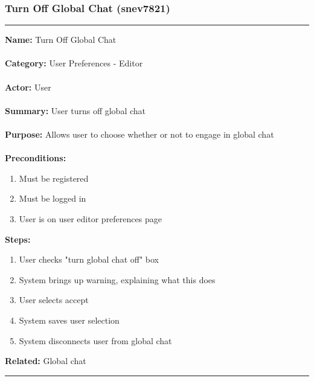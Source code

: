 \documentclass[11pt]{report}
\begin{document}
\subsubsection{Turn Off Global Chat (snev7821)}
\vspace{2pt}
\hrule
\vspace{8pt}
	\noindent\textbf{Name:} Turn Off Global Chat \\ \\
	\textbf{Category:} User Preferences - Editor  \\ \\
	\textbf{Actor:} User \\ \\
	\textbf{Summary:} User turns off global chat \\ \\
	\textbf{Purpose:} Allows user to choose whether or not to engage in global chat \\ \\
	\textbf{Preconditions:} 
	\begin{enumerate}
		\item Must be registered
		\item Must be logged in
		\item User is on user editor preferences page
	\end{enumerate}
	\textbf{Steps:}
	\begin{enumerate}
		\item User checks "turn global chat off" box
		\item System brings up warning, explaining what this does
		\item User selects accept
		\item System saves user selection
		\item System disconnects user from global chat
	\end{enumerate}
	\textbf{Related:} Global chat
\vspace{8pt}
\hrule
\newpage
\end{document}
